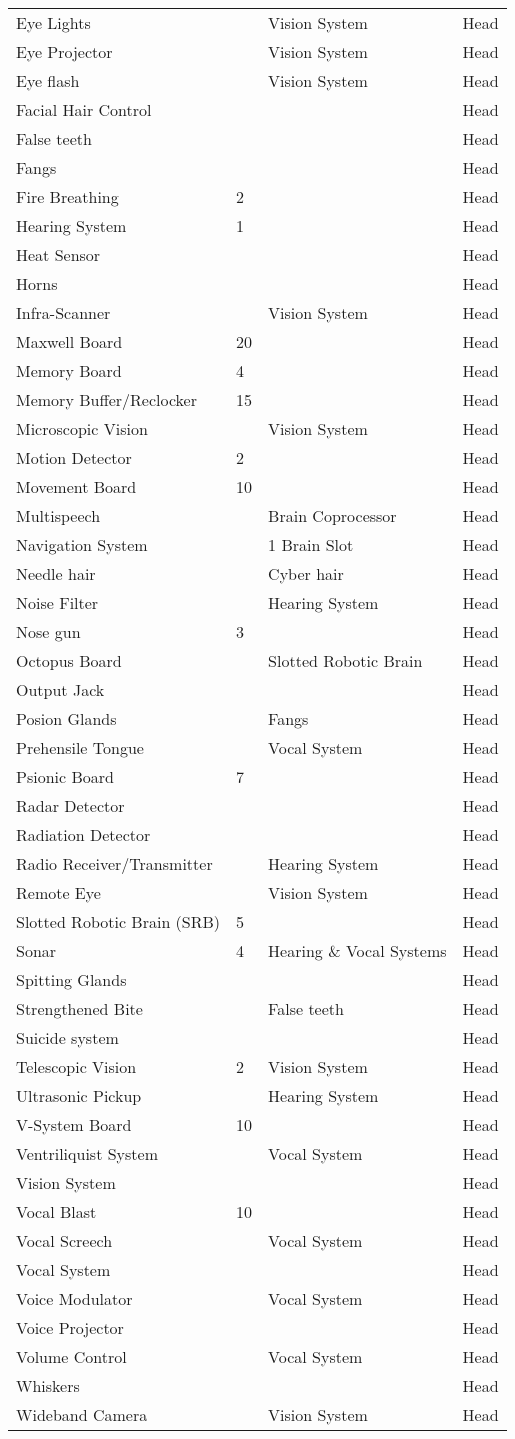 \documentclass[twoside]{book}
\begin{document}
\begin{longtable}{p{1.25in}p{2em}ll}
      \raggedright  Eye Lights&& Vision System& Head\tabularnewline
      \raggedright  Eye Projector&& Vision System& Head\tabularnewline
      \raggedright  Eye flash&& Vision System& Head\tabularnewline
      \raggedright  Facial Hair Control&&& Head\tabularnewline
      \raggedright  False teeth&&& Head\tabularnewline
      \raggedright  Fangs&&& Head\tabularnewline
      \raggedright  Fire Breathing& 2&& Head\tabularnewline
      \raggedright  Hearing System& 1&& Head\tabularnewline
      \raggedright  Heat Sensor&&& Head\tabularnewline
      \raggedright  Horns&&& Head\tabularnewline
      \raggedright  Infra-Scanner&& Vision System& Head\tabularnewline
      \raggedright  Maxwell Board& 20&& Head\tabularnewline
      \raggedright  Memory Board& 4&& Head\tabularnewline
      \raggedright  Memory Buffer/Reclocker& 15&& Head\tabularnewline
      \raggedright  Microscopic Vision&& Vision System& Head\tabularnewline
      \raggedright  Motion Detector& 2&& Head\tabularnewline
      \raggedright  Movement Board& 10&& Head\tabularnewline
      \raggedright  Multispeech&& Brain Coprocessor& Head\tabularnewline
      \raggedright  Navigation System&& 1 Brain Slot& Head\tabularnewline
      \raggedright  Needle hair&& Cyber hair& Head\tabularnewline
      \raggedright  Noise Filter&& Hearing System& Head\tabularnewline
      \raggedright  Nose gun& 3&& Head\tabularnewline
      \raggedright  Octopus Board&& Slotted Robotic Brain& Head\tabularnewline
      \raggedright  Output Jack&&& Head\tabularnewline
      \raggedright  Posion Glands&& Fangs& Head\tabularnewline
      \raggedright  Prehensile Tongue&& Vocal System& Head\tabularnewline
      \raggedright  Psionic Board& 7&& Head\tabularnewline
      \raggedright  Radar Detector&&& Head\tabularnewline
      \raggedright  Radiation Detector&&& Head\tabularnewline
      \raggedright  Radio Receiver/Transmitter&& Hearing System& Head\tabularnewline
      \raggedright  Remote Eye&& Vision System& Head\tabularnewline
      \raggedright  Slotted Robotic Brain (SRB)& 5&& Head\tabularnewline
      \raggedright  Sonar& 4& Hearing \& Vocal
           Systems& Head\tabularnewline
      \raggedright  Spitting Glands&&& Head\tabularnewline
      \raggedright  Strengthened Bite&& False teeth& Head\tabularnewline
      \raggedright  Suicide system&&& Head\tabularnewline
      \raggedright  Telescopic Vision& 2& Vision System& Head\tabularnewline
      \raggedright  Ultrasonic Pickup&& Hearing System& Head\tabularnewline
      \raggedright  V-System Board& 10&& Head\tabularnewline
      \raggedright  Ventriliquist System&& Vocal System& Head\tabularnewline
      \raggedright  Vision System&&& Head\tabularnewline
      \raggedright  Vocal Blast& 10&& Head\tabularnewline
      \raggedright  Vocal Screech&& Vocal System& Head\tabularnewline
      \raggedright  Vocal System&&& Head\tabularnewline
      \raggedright  Voice Modulator&& Vocal System& Head\tabularnewline
      \raggedright  Voice Projector&&& Head\tabularnewline
      \raggedright  Volume Control&& Vocal System& Head\tabularnewline
      \raggedright  Whiskers&&& Head\tabularnewline
      \raggedright  Wideband Camera&& Vision System& Head\tabularnewline
      
\end{longtable}
    
\end{document}
